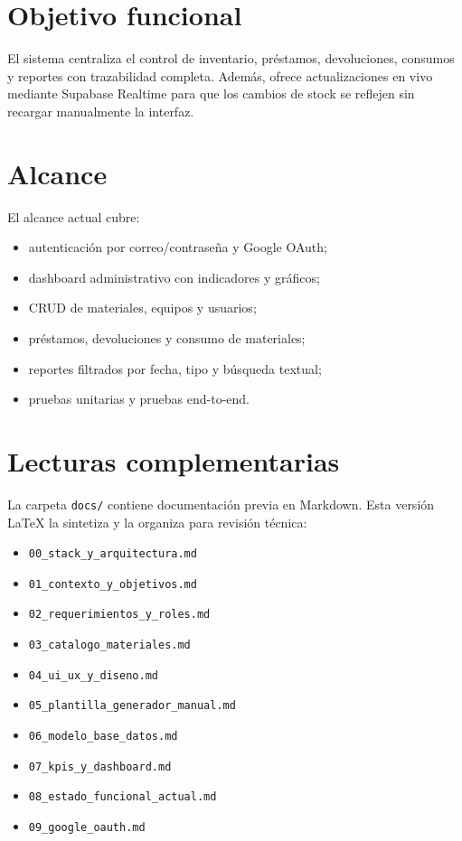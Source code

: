 \documentclass[12pt,a4paper,oneside]{report}
\newcommand{\file}[1]{\texttt{\color{cecyteDark}#1}}
\begin{document}
\section{Objetivo funcional}

El sistema centraliza el control de inventario, préstamos, devoluciones, consumos y reportes con trazabilidad completa. Además, ofrece actualizaciones en vivo mediante Supabase Realtime para que los cambios de stock se reflejen sin recargar manualmente la interfaz.

\section{Alcance}

El alcance actual cubre:

\begin{itemize}
  \item autenticación por correo/contraseña y Google OAuth;
  \item dashboard administrativo con indicadores y gráficos;
  \item CRUD de materiales, equipos y usuarios;
  \item préstamos, devoluciones y consumo de materiales;
  \item reportes filtrados por fecha, tipo y búsqueda textual;
  \item pruebas unitarias y pruebas end-to-end.
\end{itemize}

\section{Lecturas complementarias}

La carpeta \file{docs/} contiene documentación previa en Markdown. Esta versión \LaTeX{} la sintetiza y la organiza para revisión técnica:

\begin{itemize}
  \item \file{00\_stack\_y\_arquitectura.md}
  \item \file{01\_contexto\_y\_objetivos.md}
  \item \file{02\_requerimientos\_y\_roles.md}
  \item \file{03\_catalogo\_materiales.md}
  \item \file{04\_ui\_ux\_y\_diseno.md}
  \item \file{05\_plantilla\_generador\_manual.md}
  \item \file{06\_modelo\_base\_datos.md}
  \item \file{07\_kpis\_y\_dashboard.md}
  \item \file{08\_estado\_funcional\_actual.md}
  \item \file{09\_google\_oauth.md}
\end{itemize}
\end{document}
